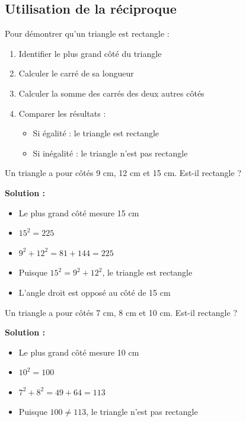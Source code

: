 \subsection{Utilisation de la réciproque}
\begin{methodebox}
Pour démontrer qu'un triangle est rectangle :
\begin{enumerate}
    \item Identifier le plus grand côté du triangle
    \item Calculer le carré de sa longueur
    \item Calculer la somme des carrés des deux autres côtés
    \item Comparer les résultats :
    \begin{itemize}
        \item Si égalité : le triangle est rectangle
        \item Si inégalité : le triangle n'est pas rectangle
    \end{itemize}
\end{enumerate}
\end{methodebox}

\begin{examplebox}
Un triangle a pour côtés 9 cm, 12 cm et 15 cm. Est-il rectangle ?

\textbf{Solution :}
\begin{itemize}
    \item Le plus grand côté mesure 15 cm
    \item $15^2 = 225$
    \item $9^2 + 12^2 = 81 + 144 = 225$
    \item Puisque $15^2 = 9^2 + 12^2$, le triangle est rectangle
    \item L'angle droit est opposé au côté de 15 cm
\end{itemize}
\end{examplebox}

\begin{examplebox}
Un triangle a pour côtés 7 cm, 8 cm et 10 cm. Est-il rectangle ?

\textbf{Solution :}
\begin{itemize}
    \item Le plus grand côté mesure 10 cm
    \item $10^2 = 100$
    \item $7^2 + 8^2 = 49 + 64 = 113$
    \item Puisque $100 \neq 113$, le triangle n'est pas rectangle
\end{itemize}
\end{examplebox}

